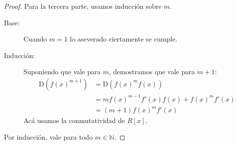 \begin{proof}
    Para la tercera parte,
    usamos inducción sobre \(m\).%
    \begin{description}
    \item[Base:]
      Cuando \(m = 1\)
      lo aseverado ciertamente se cumple.
    \item[Inducción:]
      Suponiendo que vale para \(m\),
      demostramos que vale para \(m + 1\):
      \begin{align*}
	\mathrm{D} (f(x)^{m + 1})
	  &= \mathrm{D} (f(x)^m f(x)) \\
	  &= m f(x)^{m - 1} f'(x) f(x) + f(x)^m f'(x) \\
	  &= (m + 1) f(x)^m f'(x)
      \end{align*}
      Acá usamos la conmutatividad de \(R[x]\).
    \end{description}
    Por inducción,
    vale para todo \(m \in \mathbb{N}\).
  \end{proof}

